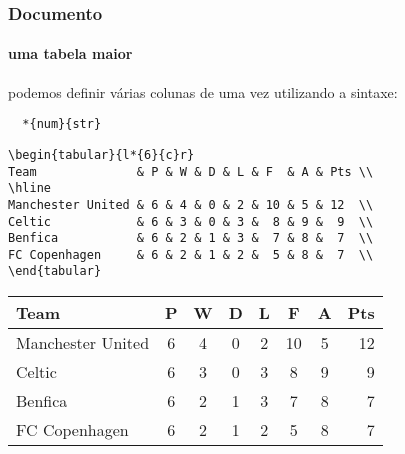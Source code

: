 \begin{frame}[fragile]
\frametitle{Documento}
\framesubtitle{uma tabela maior}
\scriptsize
  podemos definir várias colunas de uma vez utilizando a sintaxe:
  \vspace{-0.2cm}
  \begin{verbatim}
  *{num}{str}
  \end{verbatim}
  \vspace{-0.5cm}
  \begin{verbatim}
\begin{tabular}{l*{6}{c}r}
Team              & P & W & D & L & F  & A & Pts \\
\hline
Manchester United & 6 & 4 & 0 & 2 & 10 & 5 & 12  \\
Celtic            & 6 & 3 & 0 & 3 &  8 & 9 &  9  \\
Benfica           & 6 & 2 & 1 & 3 &  7 & 8 &  7  \\
FC Copenhagen     & 6 & 2 & 1 & 2 &  5 & 8 &  7  \\
\end{tabular}
  \end{verbatim}
  \vspace{-0.2cm}
  \begin{fmpage}{\textwidth}
\begin{tabular}{l*{6}{c}r}
Team              & P & W & D & L & F  & A & Pts \\
\hline
Manchester United & 6 & 4 & 0 & 2 & 10 & 5 & 12  \\
Celtic            & 6 & 3 & 0 & 3 &  8 & 9 &  9  \\
Benfica           & 6 & 2 & 1 & 3 &  7 & 8 &  7  \\
FC Copenhagen     & 6 & 2 & 1 & 2 &  5 & 8 &  7  \\
\end{tabular}
\end{fmpage}
\end{frame}


